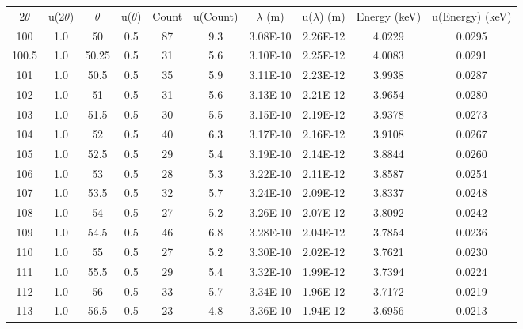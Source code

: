 \documentclass[justified]{tufte-book}
\begin{document}
\begin{table}[ht]
\center
\begin{tabular}{cccccccccc}
2$\theta$ & u(2$\theta$) & $\theta$ & u($\theta$) & Count & u(Count) & $\lambda$ (m) & u($\lambda$) (m) & Energy (keV) & u(Energy) (keV) \\
100       & 1.0 & 50       & 0.5         & 87    & 9.3      & 3.08E-10      & 2.26E-12         & 4.0229       & 0.0295 \\
100.5       & 1.0 & 50.25    & 0.5         & 31    & 5.6      & 3.10E-10      & 2.25E-12         & 4.0083       & 0.0291 \\
101       & 1.0 & 50.5     & 0.5         & 35    & 5.9      & 3.11E-10      & 2.23E-12         & 3.9938       & 0.0287 \\
102       & 1.0 & 51       & 0.5         & 31    & 5.6      & 3.13E-10      & 2.21E-12         & 3.9654       & 0.0280 \\
103       & 1.0 & 51.5     & 0.5         & 30    & 5.5      & 3.15E-10      & 2.19E-12         & 3.9378       & 0.0273 \\
104       & 1.0 & 52       & 0.5         & 40    & 6.3      & 3.17E-10      & 2.16E-12         & 3.9108       & 0.0267 \\
105       & 1.0 & 52.5     & 0.5         & 29    & 5.4      & 3.19E-10      & 2.14E-12         & 3.8844       & 0.0260 \\
106       & 1.0 & 53       & 0.5         & 28    & 5.3      & 3.22E-10      & 2.11E-12         & 3.8587       & 0.0254 \\
107       & 1.0 & 53.5     & 0.5         & 32    & 5.7      & 3.24E-10      & 2.09E-12         & 3.8337       & 0.0248 \\
108       & 1.0 & 54       & 0.5         & 27    & 5.2      & 3.26E-10      & 2.07E-12         & 3.8092       & 0.0242 \\
109       & 1.0 & 54.5     & 0.5         & 46    & 6.8      & 3.28E-10      & 2.04E-12         & 3.7854       & 0.0236 \\
110       & 1.0 & 55       & 0.5         & 27    & 5.2      & 3.30E-10      & 2.02E-12         & 3.7621       & 0.0230 \\
111       & 1.0 & 55.5     & 0.5         & 29    & 5.4      & 3.32E-10      & 1.99E-12         & 3.7394       & 0.0224 \\
112       & 1.0 & 56       & 0.5         & 33    & 5.7      & 3.34E-10      & 1.96E-12         & 3.7172       & 0.0219 \\
113       & 1.0 & 56.5     & 0.5         & 23    & 4.8      & 3.36E-10      & 1.94E-12         & 3.6956       & 0.0213 \\

\end{tabular}
\end{table}
\end{document}
